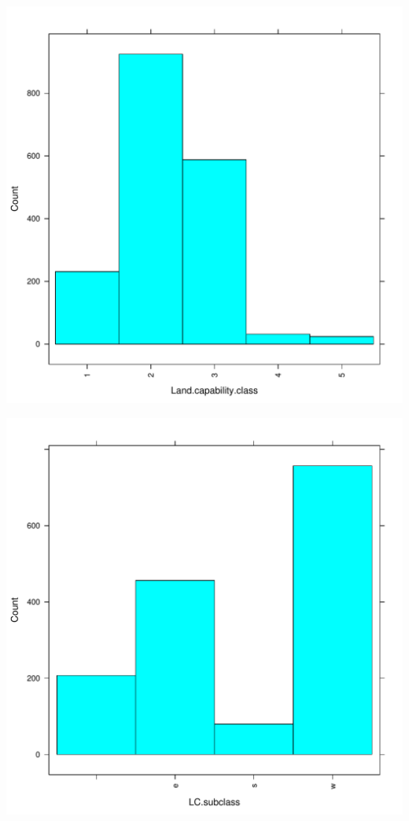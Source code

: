 \documentclass{article}\usepackage[]{graphicx}\usepackage[]{color}
\makeatletter
\def\maxwidth{ %
  \ifdim\Gin@nat@width>\linewidth
    \linewidth
  \else
    \Gin@nat@width
  \fi
}
\newenvironment{knitrout}{}{} %
\makeatother
\begin{document}
\begin{knitrout}
{}




{\centering \includegraphics[width=\maxwidth]{figure/HistogramsPredictorVariables-7} 

}




{\centering \includegraphics[width=\maxwidth]{figure/HistogramsPredictorVariables-8} 

}



\end{knitrout}
\end{document}
